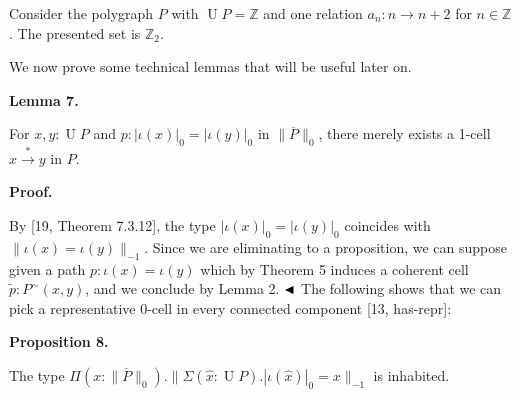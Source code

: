 Consider the polygraph $P$ with $\operatorname{U}P=\mathbb{Z}$ and one relation $a_{n}:n\to n+2$ for $n\in\mathbb{Z}$. The presented set is $\mathbb{Z}_{2}$.\par
 
 
 
 
We now prove some technical lemmas that will be useful later on.\par
 
 
 
\par\medskip\noindent\textbf{Lemma 7.}\par
 
 
For $x,y:\operatorname{U}P$ and $p:|\iota(x)|_{0}=|\iota(y)|_{0}$ in $\|\overline{P}\|_{0}$, there merely exists a 1-cell $x\overset{*}{\to}y$ in $P$.\par
 
 
 
 
 
\par\medskip\noindent\textbf{Proof.}\par
 
 
By [19, Theorem 7.3.12], the type $|\iota(x)|_{0}=|\iota(y)|_{0}$ coincides with $\|\iota(x)=\iota(y)\|_{-1}$. Since we are eliminating to a proposition, we can suppose given a path $p:\iota(x)=\iota(y)$ which by Theorem 5 induces a coherent cell $\tilde{p}:P^{\sim}(x,y)$, and we conclude by Lemma 2. $\hfill\blacktriangleleft$ The following shows that we can pick a representative 0-cell in every connected component [13, has-repr]:\par
 
 
 
\par\medskip\noindent\textbf{Proposition 8.}\par
 
 
The type $\Pi(x:\|\overline{P}\|_{0}).\|\Sigma(\hat{x}:\operatorname{U}P).|\iota(\hat{x})|_{0}=x\|_{-1}$ is inhabited.\par
 
